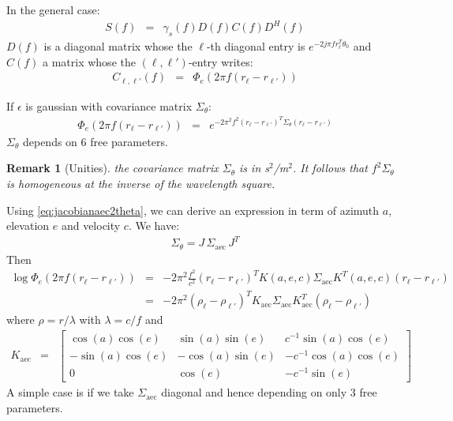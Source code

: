 \documentclass[a4paper, 12pt]{report}
\newtheorem{remark}{Remark}
\def\aec{\mathrm{aec}}
\begin{document}
In the general case:
\begin{eqnarray*}
 S(f) &=& \gamma_s(f)D(f)C(f)D^H(f)
\end{eqnarray*}
$D(f)$ is a diagonal matrix whose the $\ell$-th diagonal entry is $e^{-2j\pi f r_{\ell}^T\theta_0}$ and $C(f)$ a matrix whose the $(\ell,\ell')$-entry writes:
\begin{eqnarray*}
 C_{\ell,\ell'}(f) &=& \Phi_{e}(2\pi f(r_{\ell}-r_{\ell'}))
\end{eqnarray*}

If $\epsilon$ is gaussian with covariance matrix $\Sigma_{\theta}$:
\begin{eqnarray*}
 \Phi_{e}(2\pi f(r_{\ell}-r_{\ell'}))&=& e^{-2\pi^2f^2 (r_{\ell}-r_{\ell'})^T\Sigma_{\theta}(r_{\ell}-r_{\ell'})}
\end{eqnarray*}
$\Sigma_{\theta}$ depends on 6 free parameters. 

\begin{remark}[Unities]
the covariance matrix $\Sigma_{\theta}$ is in s$^2$/m$^2$. It follows that $f^2 \Sigma_{\theta}$ is homogeneous at the inverse of the wavelength square.
\end{remark}


Using \eqref{eq:jacobianaec2theta}, we can derive an expression in term of azimuth $a$, elevation $e$ and velocity $c$. We have:
\begin{eqnarray}
\label{eq:theta2aec}
\Sigma_{\theta}=J\,\Sigma_{\aec}\,J^{T}
\end{eqnarray}
Then
\begin{eqnarray*}
 \log \Phi_{e}(2\pi f(r_{\ell}-r_{\ell'}))&=& 
-2\pi^2\frac{f^2}{c^2} (r_{\ell}-r_{\ell'})^TK(a,e,c)\Sigma_{\aec}K^T(a,e,c)(r_{\ell}-r_{\ell'})
\\
&=&
-2\pi^2(\rho_{\ell}-\rho_{\ell'})^TK_{\aec}\Sigma_{\aec}K^T_{\aec}(\rho_{\ell}-\rho_{\ell'})
\end{eqnarray*}
where $\rho=r/\lambda$ with $\lambda=c/f$ and
\begin{eqnarray*}
K_{\aec}&=&
\begin{bmatrix}
\cos(a)\cos(e)&\sin(a)\sin(e)&c^{-1}\sin(a)\cos(e)
\\
-\sin(a)\cos(e)&-\cos(a)\sin(e)&-c^{-1}\cos(a)\cos(e)
\\
0&\cos(e)&-c^{-1}\sin(e)
\end{bmatrix}
\end{eqnarray*}
A simple case is if we take $\Sigma_{\aec}$ diagonal and hence depending on only 3 free parameters. 
\end{document}
